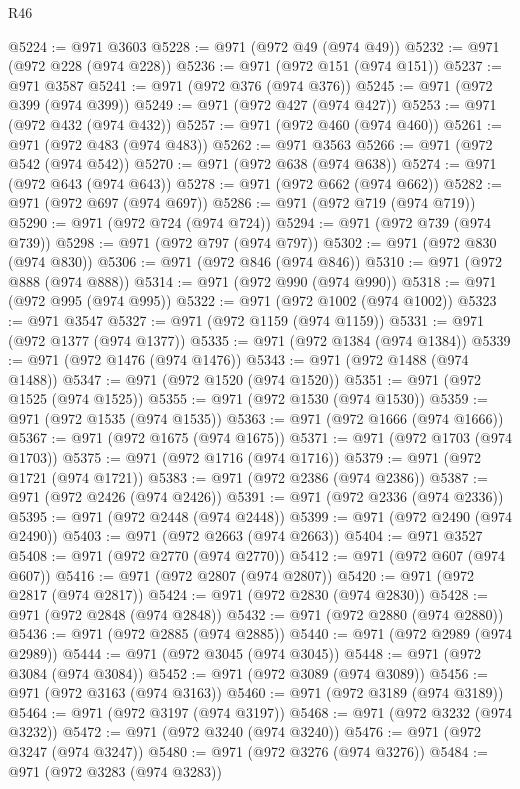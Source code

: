 \begin{lexlean}{R46}
\begin{coremodule}
@5224 := @971 @3603
@5228 := @971 (@972 @49 (@974 @49))
@5232 := @971 (@972 @228 (@974 @228))
@5236 := @971 (@972 @151 (@974 @151))
@5237 := @971 @3587
@5241 := @971 (@972 @376 (@974 @376))
@5245 := @971 (@972 @399 (@974 @399))
@5249 := @971 (@972 @427 (@974 @427))
@5253 := @971 (@972 @432 (@974 @432))
@5257 := @971 (@972 @460 (@974 @460))
@5261 := @971 (@972 @483 (@974 @483))
@5262 := @971 @3563
@5266 := @971 (@972 @542 (@974 @542))
@5270 := @971 (@972 @638 (@974 @638))
@5274 := @971 (@972 @643 (@974 @643))
@5278 := @971 (@972 @662 (@974 @662))
@5282 := @971 (@972 @697 (@974 @697))
@5286 := @971 (@972 @719 (@974 @719))
@5290 := @971 (@972 @724 (@974 @724))
@5294 := @971 (@972 @739 (@974 @739))
@5298 := @971 (@972 @797 (@974 @797))
@5302 := @971 (@972 @830 (@974 @830))
@5306 := @971 (@972 @846 (@974 @846))
@5310 := @971 (@972 @888 (@974 @888))
@5314 := @971 (@972 @990 (@974 @990))
@5318 := @971 (@972 @995 (@974 @995))
@5322 := @971 (@972 @1002 (@974 @1002))
@5323 := @971 @3547
@5327 := @971 (@972 @1159 (@974 @1159))
@5331 := @971 (@972 @1377 (@974 @1377))
@5335 := @971 (@972 @1384 (@974 @1384))
@5339 := @971 (@972 @1476 (@974 @1476))
@5343 := @971 (@972 @1488 (@974 @1488))
@5347 := @971 (@972 @1520 (@974 @1520))
@5351 := @971 (@972 @1525 (@974 @1525))
@5355 := @971 (@972 @1530 (@974 @1530))
@5359 := @971 (@972 @1535 (@974 @1535))
@5363 := @971 (@972 @1666 (@974 @1666))
@5367 := @971 (@972 @1675 (@974 @1675))
@5371 := @971 (@972 @1703 (@974 @1703))
@5375 := @971 (@972 @1716 (@974 @1716))
@5379 := @971 (@972 @1721 (@974 @1721))
@5383 := @971 (@972 @2386 (@974 @2386))
@5387 := @971 (@972 @2426 (@974 @2426))
@5391 := @971 (@972 @2336 (@974 @2336))
@5395 := @971 (@972 @2448 (@974 @2448))
@5399 := @971 (@972 @2490 (@974 @2490))
@5403 := @971 (@972 @2663 (@974 @2663))
@5404 := @971 @3527
@5408 := @971 (@972 @2770 (@974 @2770))
@5412 := @971 (@972 @607 (@974 @607))
@5416 := @971 (@972 @2807 (@974 @2807))
@5420 := @971 (@972 @2817 (@974 @2817))
@5424 := @971 (@972 @2830 (@974 @2830))
@5428 := @971 (@972 @2848 (@974 @2848))
@5432 := @971 (@972 @2880 (@974 @2880))
@5436 := @971 (@972 @2885 (@974 @2885))
@5440 := @971 (@972 @2989 (@974 @2989))
@5444 := @971 (@972 @3045 (@974 @3045))
@5448 := @971 (@972 @3084 (@974 @3084))
@5452 := @971 (@972 @3089 (@974 @3089))
@5456 := @971 (@972 @3163 (@974 @3163))
@5460 := @971 (@972 @3189 (@974 @3189))
@5464 := @971 (@972 @3197 (@974 @3197))
@5468 := @971 (@972 @3232 (@974 @3232))
@5472 := @971 (@972 @3240 (@974 @3240))
@5476 := @971 (@972 @3247 (@974 @3247))
@5480 := @971 (@972 @3276 (@974 @3276))
@5484 := @971 (@972 @3283 (@974 @3283))

\end{coremodule}
\end{lexlean}
